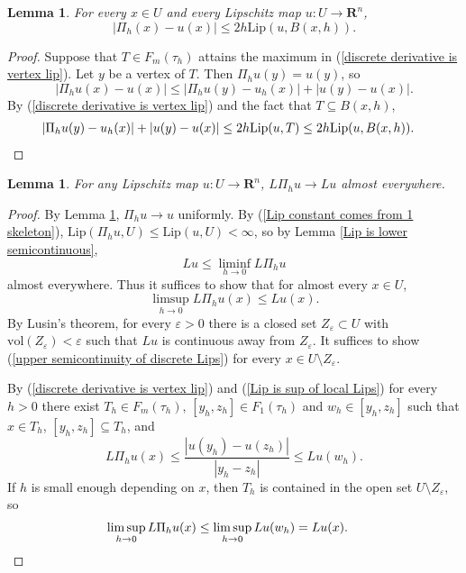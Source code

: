 \documentclass[reqno,11pt]{amsart}
\newcommand{\RR}{\mathbf{R}}
\newcommand{\vol}{\mathrm{vol}}
\newcommand{\Lip}{\mathrm{Lip}}
\newtheorem{lemma}[theorem]{Lemma}
\theoremstyle{definition}
\numberwithin{equation}{section}
\begin{document}
\begin{lemma}\label{uniform convergence}
For every $x \in U$ and every Lipschitz map $u: U \to \RR^n$,
$$|\Pi_h(x) - u(x)| \leq 2h \Lip(u, B(x, h)).$$
\end{lemma}
\begin{proof}
Suppose that $T \in F_m(\tau_h)$ attains the maximum in (\ref{discrete derivative is vertex lip}).
Let $y$ be a vertex of $T$.
Then $\Pi_h u(y) = u(y)$, so 
$$|\Pi_h u(x) - u(x)| \leq |\Pi_h u(y) - u_h(x)| + |u(y) - u(x)|.$$
By (\ref{discrete derivative is vertex lip}) and the fact that $T \subseteq B(x, h)$,
\begin{align*}
|\Pi_h u(y) - u_h(x)| + |u(y) - u(x)| &\leq 2h \Lip(u, T) \leq 2h \Lip(u, B(x, h)). \qedhere
\end{align*}
\end{proof}

\begin{lemma}\label{du converges ae}
For any Lipschitz map $u: U \to \RR^n$, $L\Pi_h u \to Lu$ almost everywhere.
\end{lemma}
\begin{proof}
By Lemma \ref{uniform convergence}, $\Pi_h u \to u$ uniformly.
By (\ref{Lip constant comes from 1 skeleton}), $\Lip(\Pi_h u, U) \leq \Lip(u, U) < \infty$, so by Lemma \ref{Lip is lower semicontinuous},
$$Lu \leq \liminf_{h \to 0} L\Pi_hu$$
almost everywhere.
Thus it suffices to show that for almost every $x \in U$,
\begin{equation}\label{upper semicontinuity of discrete Lips}
\limsup_{h \to 0} L\Pi_h u(x) \leq Lu(x).
\end{equation}
By Lusin's theorem, for every $\varepsilon > 0$ there is a closed set $Z_\varepsilon \subset U$ with $\vol(Z_\varepsilon) < \varepsilon$ such that $Lu$ is continuous away from $Z_\varepsilon$.
It suffices to show (\ref{upper semicontinuity of discrete Lips}) for every $x \in U \setminus Z_\varepsilon$.

By (\ref{discrete derivative is vertex lip}) and (\ref{Lip is sup of local Lips}) for every $h > 0$ there exist $T_h \in F_m(\tau_h)$, $[y_h, z_h] \in F_1(\tau_h)$ and $w_h \in [y_h, z_h]$ such that $x \in T_h$, $[y_h, z_h] \subseteq T_h$, and
$$L \Pi_h u(x) \leq \frac{|u(y_h) - u(z_h)|}{|y_h - z_h|} \leq Lu(w_h).$$
If $h$ is small enough depending on $x$, then $T_h$ is contained in the open set $U \setminus Z_\varepsilon$, so 
\begin{align*}
\limsup_{h \to 0} L \Pi_h u(x) \leq \limsup_{h \to 0} Lu(w_h) &= Lu(x). \qedhere
\end{align*}
\end{proof}
\end{document}
